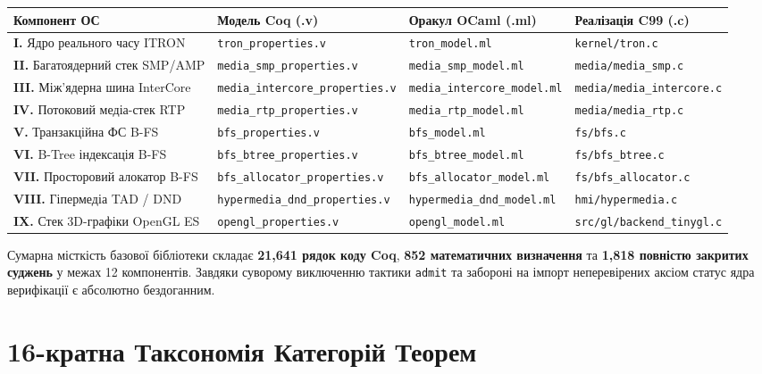 \documentclass{article}
\begin{document}
\begin{center}
\small
\begin{longtable}{@{}p{3.1cm}p{3.4cm}p{3.4cm}p{3.5cm}@{}}
\toprule
\textbf{Компонент ОС} & \textbf{Модель Coq (.v)} & \textbf{Оракул OCaml (.ml)} & \textbf{Реалізація C99 (.c)} \\
\midrule
\endhead
\textbf{I.} Ядро реального часу ITRON & \texttt{tron\_properties.v} & \texttt{tron\_model.ml} & \texttt{kernel/tron.c} \\
\textbf{II.} Багатоядерний стек SMP/AMP & \texttt{media\_smp\_properties.v} & \texttt{media\_smp\_model.ml} & \texttt{media/media\_smp.c} \\
\textbf{III.} Між'ядерна шина InterCore & \texttt{media\_intercore\_properties.v} & \texttt{media\_intercore\_model.ml} & \texttt{media/media\_intercore.c} \\
\textbf{IV.} Потоковий медіа-стек RTP & \texttt{media\_rtp\_properties.v} & \texttt{media\_rtp\_model.ml} & \texttt{media/media\_rtp.c} \\
\textbf{V.} Транзакційна ФС B-FS & \texttt{bfs\_properties.v} & \texttt{bfs\_model.ml} & \texttt{fs/bfs.c} \\
\textbf{VI.} B-Tree індексація B-FS & \texttt{bfs\_btree\_properties.v} & \texttt{bfs\_btree\_model.ml} & \texttt{fs/bfs\_btree.c} \\
\textbf{VII.} Просторовий алокатор B-FS & \texttt{bfs\_allocator\_properties.v} & \texttt{bfs\_allocator\_model.ml} & \texttt{fs/bfs\_allocator.c} \\
\textbf{VIII.} Гіпермедіа TAD / DND & \texttt{hypermedia\_dnd\_properties.v} & \texttt{hypermedia\_dnd\_model.ml} & \texttt{hmi/hypermedia.c} \\
\textbf{IX.} Стек 3D-графіки OpenGL ES & \texttt{opengl\_properties.v} & \texttt{opengl\_model.ml} & \texttt{src/gl/backend\_tinygl.c} \\
\bottomrule
\end{longtable}
\end{center}

Сумарна місткість базової бібліотеки складає \textbf{21,641 рядок коду Coq}, \textbf{852 математичних визначення} та \textbf{1,818 повністю закритих суджень} у межах 12 компонентів. Завдяки суворому виключенню тактики \texttt{admit} та забороні на імпорт неперевірених аксіом статус ядра верифікації є абсолютно бездоганним.

\section{16-кратна Таксономія Категорій Теорем}
\end{document}
